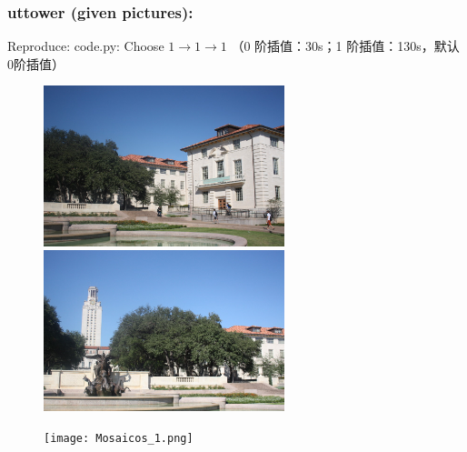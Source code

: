 \documentclass[a4paper,UTF8]{article}
\numberwithin{equation}{section}
\begin{document}
\subsubsection{uttower (given pictures):}
Reproduce:
code.py: Choose $1 \rightarrow 1 \rightarrow 1$ （0 阶插值：30s；1 阶插值：130s，默认0阶插值）
\begin{figure}[!h]
\centering
\begin{minipage}[t]{0.48\textwidth}
\centering
\includegraphics[width=7cm]{uttower1.jpg}
\end{minipage}
\begin{minipage}[t]{0.48\textwidth}
\centering
\includegraphics[width=7cm]{uttower2.jpg}
\end{minipage}
\end{figure}
\begin{figure}[h]
	\centering  %
	\texttt{[image: Mosaicos\_1.png]}  %
\end{figure}

\newpage
\end{document}
